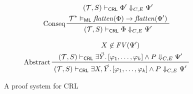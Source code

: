 \begin{figure}
\begin{align*}
    & \prftree[l]{Conseq}
      { \prfStackPremises
        { (\mathcal{T}, S) \vdash_\CRL \Phi^\prime \Downarrow_{C, E} \Psi^\prime}
        { \mathcal{T}^* \vDash_\ML \mathit{flatten}(\Phi) \rightarrow \mathit{flatten}(\Phi^\prime) }
      }
      { (\mathcal{T}, S) \vdash_\CRL \Phi \Downarrow_{C, E} \Psi^\prime}
    \end{align*}

    
    \begin{align*}
    & \prftree[l]{Abstract}
      { \prfStackPremises
        { X \not\in \mathit{FV}(\Psi^\prime)
        }
        {(\mathcal{T}, S) \vdash_\CRL \exists \vec{Y}.\, [\varphi_1, \ldots, \varphi_k] \land P \Downarrow_{C, E} \Psi^\prime}
      }
      {(\mathcal{T}, S) \vdash_\CRL \exists X, \vec{Y}.\, [\varphi_1, \ldots, \varphi_k] \land P \Downarrow_{C, E} \Psi^\prime}
    \end{align*}
    \caption{A proof system for CRL}
    \label{fig:CRLproofsystem}
\end{figure}


